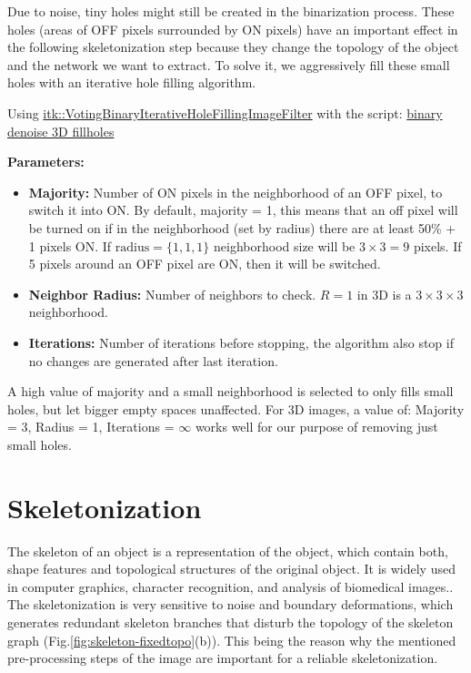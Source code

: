 Due to noise, tiny holes might still be created in the binarization process. These holes (areas of OFF pixels surrounded by ON pixels) have an important effect in the following skeletonization step because they change the topology of the object and the network we want to extract. To solve it, we aggressively fill these small holes with an iterative hole filling algorithm.


Using \href{https://itk.org/Doxygen/html/classitk_1_1VotingBinaryIterativeHoleFillingImageFilter.html}{itk::VotingBinaryIterativeHoleFillingImageFilter} with the script:
\href{https://github.com/phcerdan/ITKfilters/blob/master/scripts-python/binary_denoise_3d_fillholes_iterative.py}{binary denoise 3D fillholes}

\noindent\textbf{Parameters:}

\begin{itemize}[topsep=0pt]
  \item \textbf{Majority: } Number of ON pixels in the neighborhood of an OFF pixel, to switch it into ON. By default, majority = 1, this means that an off pixel will be turned on if in the neighborhood (set by radius) there are at least 50\% + 1 pixels ON. If $\text{radius} = \{1,1,1\}$ neighborhood size will be $3\times3 = 9$ pixels. If 5 pixels around an OFF pixel are ON, then it will be switched.
  \item \textbf{Neighbor Radius: } Number of neighbors to check. $R = 1$ in 3D is a $3\times3\times3$ neighborhood.
  \item \textbf{Iterations: } Number of iterations before stopping, the algorithm also stop if no changes are generated after last iteration.
\end{itemize}

A high value of majority and a small neighborhood is selected to only fills small holes, but let bigger empty spaces unaffected. \newline
For 3D images, a value of:\newline
Majority = 3, Radius = 1, Iterations = $\infty$ works well for our purpose of removing just small holes.


\section{Skeletonization}%
\label{sec:skeletonization}

The skeleton of an object is a representation of the object, which contain both,
shape features and topological structures of the original object. It is widely
used in computer graphics, character recognition, and analysis of biomedical
images.\citep{bai_skeleton_2007,golland_fixed_2000,ge_generation_1996}. The
skeletonization is very sensitive to noise and boundary deformations, which generates redundant skeleton branches that disturb the
topology of the skeleton graph (Fig.\ref{fig:skeleton-fixedtopo}(b)). This being the reason why the mentioned pre-processing steps of the image are important for a reliable skeletonization.

